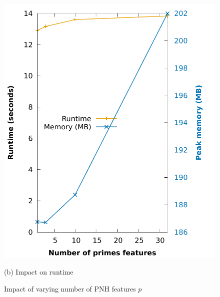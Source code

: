 \begin{figure}[h]
\begin{minipage}{\linewidth}
    \centerline{\includegraphics[width=\linewidth]{../charts/param_analysis/primes_features_runtime.pdf}}    
    \centerline{(b) Impact on runtime}
  \end{minipage}
  \caption{Impact of varying number of PNH features $p$}\label{fig:pri-qual}
\end{figure}

